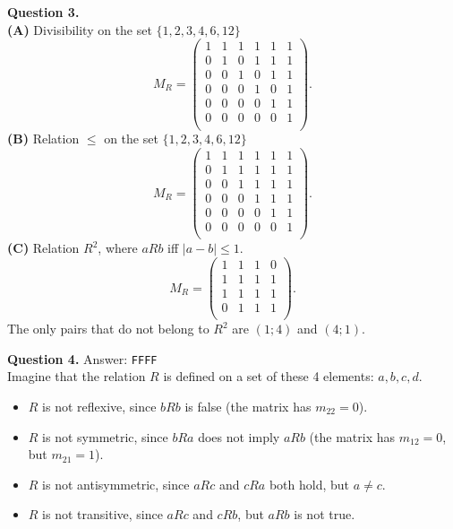 \documentclass[jou]{apa6}
\begin{document}
\vspace{6pt}
{\bf Question 3.}\\
{\bf (A)} Divisibility on the set $\{1, 2, 3, 4, 6, 12\}$
$$M_R  = \left( \begin{array}{cccccc}
1 & 1 & 1 & 1 & 1 & 1 \\
0 & 1 & 0 & 1 & 1 & 1 \\
0 & 0 & 1 & 0 & 1 & 1 \\
0 & 0 & 0 & 1 & 0 & 1 \\
0 & 0 & 0 & 0 & 1 & 1 \\
0 & 0 & 0 & 0 & 0 & 1 \\
\end{array} \right).$$
{\bf (B)} Relation $\leq$ on the set $\{1, 2, 3, 4, 6, 12\}$
$$M_R  = \left( \begin{array}{cccccc}
1 & 1 & 1 & 1 & 1 & 1 \\
0 & 1 & 1 & 1 & 1 & 1 \\
0 & 0 & 1 & 1 & 1 & 1 \\
0 & 0 & 0 & 1 & 1 & 1 \\
0 & 0 & 0 & 0 & 1 & 1 \\
0 & 0 & 0 & 0 & 0 & 1 \\
\end{array} \right).$$
{\bf (C)} Relation $R^2$, where $aRb$ iff $|a-b| \leq 1$.
$$M_R  = \left( \begin{array}{cccc}
1 & 1 & 1 & 0 \\
1 & 1 & 1 & 1 \\
1 & 1 & 1 & 1 \\
0 & 1 & 1 & 1 \\
\end{array} \right).$$
The only pairs that do not belong to $R^2$ are 
$(1;4)$ and $(4;1)$. 




\vspace{6pt}
{\bf Question 4.} Answer: {\tt FFFF}\\
Imagine that the relation $R$ is defined on a set of these 4 elements:
$a,b,c,d$. 
\begin{itemize}
\item $R$ is not reflexive, since $bRb$ is false (the matrix has $m_{22}=0$).
\item $R$ is not symmetric, since $bRa$ does not imply $aRb$
(the matrix has $m_{12}=0$, but $m_{21}=1$).
\item $R$ is not antisymmetric, since $aRc$ and $cRa$ both hold, but 
$a \neq c$.
\item $R$ is not transitive, since $aRc$ and $cRb$, but $aRb$ is not true.
\end{itemize}
\end{document}
